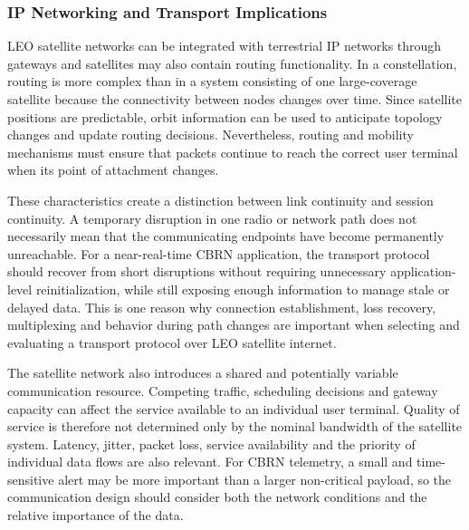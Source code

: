 \subsubsection{IP Networking and Transport Implications}
LEO satellite networks can be integrated with terrestrial IP networks through gateways and satellites may also contain routing functionality. In a constellation, routing is more complex than in a system consisting of one large-coverage satellite because the connectivity between nodes changes over time. Since satellite positions are predictable, orbit information can be used to anticipate topology changes and update routing decisions. Nevertheless, routing and mobility mechanisms must ensure that packets continue to reach the correct user terminal when its point of attachment changes.~\citep{Sun2014}
\par
These characteristics create a distinction between link continuity and session continuity. A temporary disruption in one radio or network path does not necessarily mean that the communicating endpoints have become permanently unreachable. For a near-real-time CBRN application, the transport protocol should recover from short disruptions without requiring unnecessary application-level reinitialization, while still exposing enough information to manage stale or delayed data. This is one reason why connection establishment, loss recovery, multiplexing and behavior during path changes are important when selecting and evaluating a transport protocol over LEO satellite internet.
\par
The satellite network also introduces a shared and potentially variable communication resource. Competing traffic, scheduling decisions and gateway capacity can affect the service available to an individual user terminal. Quality of service is therefore not determined only by the nominal bandwidth of the satellite system. Latency, jitter, packet loss, service availability and the priority of individual data flows are also relevant. For CBRN telemetry, a small and time-sensitive alert may be more important than a larger non-critical payload, so the communication design should consider both the network conditions and the relative importance of the data.
